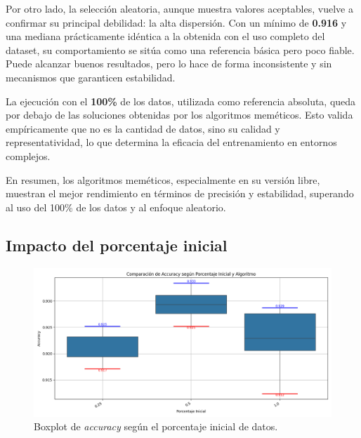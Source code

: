 Por otro lado, la selección aleatoria, aunque muestra valores aceptables, vuelve a confirmar su principal debilidad: la alta dispersión.
Con un mínimo de \textbf{0.916} y una mediana prácticamente idéntica a la obtenida con el uso completo del dataset,
su comportamiento se sitúa como una referencia básica pero poco fiable.
Puede alcanzar buenos resultados, pero lo hace de forma inconsistente y sin mecanismos que garanticen estabilidad.

La ejecución con el \textbf{100\%} de los datos, utilizada como referencia absoluta, queda por debajo de las soluciones obtenidas por los algoritmos meméticos.
Esto valida empíricamente que no es la cantidad de datos, sino su calidad y representatividad, lo que determina la eficacia del entrenamiento en entornos complejos.

En resumen, los algoritmos meméticos, especialmente en su versión libre, muestran el mejor rendimiento en términos de precisión y estabilidad,
superando al uso del 100\% de los datos y al enfoque aleatorio.

\subsection{Impacto del porcentaje inicial}
\begin{figure}[htp]
    \centering
    \includegraphics[width=1\textwidth]{imagenes/evaluaciones/painting/comparacion-por-porcentaje}
    \caption{Boxplot de \textit{accuracy} según el porcentaje inicial de datos.}
    \label{fig:accuracy_porcentaje_painting}
\end{figure}

